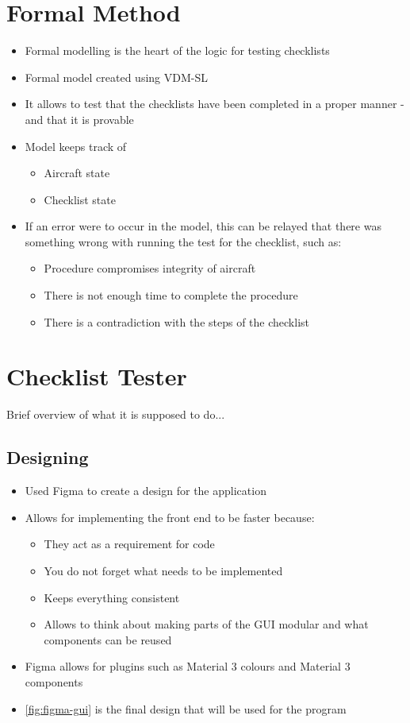 \documentclass[../dissertation.tex]{subfiles}
\begin{document}
\section{Formal Method}
\begin{itemize}
  \item Formal modelling is the heart of the logic for testing checklists
  \item Formal model created using VDM-SL
  \item It allows to test that the checklists have been completed in a proper manner
    - and that it is provable
  \item Model keeps track of
    \begin{itemize}
      \item Aircraft state
      \item Checklist state
    \end{itemize}
  \item If an error were to occur in the model, this can be relayed that there was
    something wrong with running the test for the checklist, such as:
    \begin{itemize}
      \item Procedure compromises integrity of aircraft
      \item There is not enough time to complete the procedure
      \item There is a contradiction with the steps of the checklist
    \end{itemize}
\end{itemize}


\section{Checklist Tester}
Brief overview of what it is supposed to do... %

\subsection{Designing}
\begin{itemize}
  \item Used Figma to create a design for the application
  \item Allows for implementing the front end to be faster because:
    \begin{itemize}
      \item They act as a requirement for code
      \item You do not forget what needs to be implemented
      \item Keeps everything consistent
      \item Allows to think about making parts of the GUI modular and what components can be reused
    \end{itemize}
  \item Figma allows for plugins such as Material 3 colours and Material 3 components
  \item \autoref{fig:figma-gui} is the final design that will be used for the
    program
\end{itemize}
\end{document}
